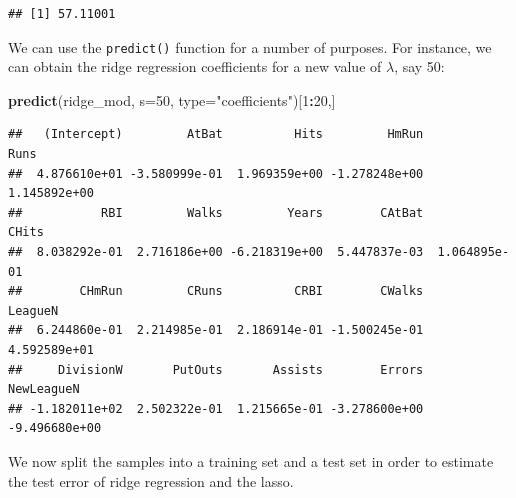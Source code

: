 \documentclass[openany]{book}
\newenvironment{Shaded}{\begin{snugshade}}{\end{snugshade}}
\newcommand{\DataTypeTok}[1]{\textcolor[rgb]{0.13,0.29,0.53}{#1}}
\newcommand{\DecValTok}[1]{\textcolor[rgb]{0.00,0.00,0.81}{#1}}
\newcommand{\KeywordTok}[1]{\textcolor[rgb]{0.13,0.29,0.53}{\textbf{#1}}}
\newcommand{\NormalTok}[1]{#1}
\newcommand{\OperatorTok}[1]{\textcolor[rgb]{0.81,0.36,0.00}{\textbf{#1}}}
\newcommand{\StringTok}[1]{\textcolor[rgb]{0.31,0.60,0.02}{#1}}
\begin{document}
\begin{verbatim}
## [1] 57.11001
\end{verbatim}

We can use the \texttt{predict()} function for a number of purposes. For instance,
we can obtain the ridge regression coefficients for a new value of \(\lambda\), say 50:

\begin{Shaded}
\begin{Highlighting}[]
\KeywordTok{predict}\NormalTok{(ridge_mod, }\DataTypeTok{s=}\DecValTok{50}\NormalTok{, }\DataTypeTok{type=}\StringTok{"coefficients"}\NormalTok{)[}\DecValTok{1}\OperatorTok{:}\DecValTok{20}\NormalTok{,]}
\end{Highlighting}
\end{Shaded}

\begin{verbatim}
##   (Intercept)         AtBat          Hits         HmRun          Runs 
##  4.876610e+01 -3.580999e-01  1.969359e+00 -1.278248e+00  1.145892e+00 
##           RBI         Walks         Years        CAtBat         CHits 
##  8.038292e-01  2.716186e+00 -6.218319e+00  5.447837e-03  1.064895e-01 
##        CHmRun         CRuns          CRBI        CWalks       LeagueN 
##  6.244860e-01  2.214985e-01  2.186914e-01 -1.500245e-01  4.592589e+01 
##     DivisionW       PutOuts       Assists        Errors    NewLeagueN 
## -1.182011e+02  2.502322e-01  1.215665e-01 -3.278600e+00 -9.496680e+00
\end{verbatim}

We now split the samples into a training set and a test set in order
to estimate the test error of ridge regression and the lasso.
\end{document}
